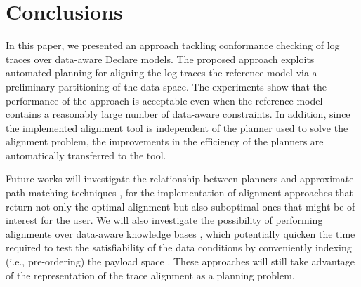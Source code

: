 \section{Conclusions}\label{sec:end}
In this paper, we presented an approach tackling conformance checking of log traces over data-aware Declare models. The proposed approach exploits automated planning for aligning the log traces the reference model via a preliminary partitioning of the data space. The experiments show that the performance of the approach is acceptable even when the reference model contains a reasonably large number of data-aware constraints. In addition, since the implemented alignment tool is independent of the planner used to solve the alignment problem, the improvements in the efficiency of the planners are automatically transferred to the tool.

Future works will investigate the relationship between planners and approximate path matching techniques \cite{Myers1989}, for the implementation of alignment approaches that return not only the optimal alignment but also suboptimal ones that might be of interest for the user. We will also investigate the possibility of performing alignments over data-aware knowledge bases \cite{10.1007/978-3-319-39696-5_18}, which potentially quicken the time required to test the satisfiability of the data conditions by conveniently indexing (i.e., pre-ordering) the payload space \cite{IdreosGNMMK12}. These approaches will still take advantage of the representation of the trace alignment as a planning problem. 
